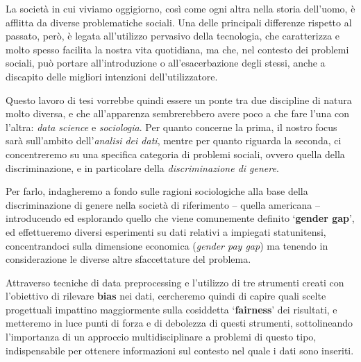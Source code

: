La societ\`a in cui viviamo oggigiorno, cos\`i come ogni altra nella storia dell'uomo, \`e afflitta da diverse problematiche sociali. Una delle principali differenze rispetto al passato, per\`o, \`e legata all'utilizzo pervasivo della tecnologia, che caratterizza e molto spesso facilita la nostra vita quotidiana, ma che, nel contesto dei problemi sociali, pu\`o portare all'introduzione o all'esacerbazione degli stessi, anche a discapito delle migliori intenzioni dell'utilizzatore.

Questo lavoro di tesi vorrebbe quindi essere un ponte tra due discipline di natura molto diversa, e che all'apparenza sembrerebbero avere poco a che fare l'una con l'altra: \textit{data science} e \textit{sociologia}. Per quanto concerne la prima, il nostro focus sar\`a sull'ambito dell'\textit{analisi dei dati}, mentre per quanto riguarda la seconda, ci concentreremo su una specifica categoria di problemi sociali, ovvero quella della discriminazione, e in particolare della \textit{discriminazione di genere}.

Per farlo, indagheremo a fondo sulle ragioni sociologiche alla base della discriminazione di genere nella societ\`a di riferimento -- quella americana -- introducendo ed esplorando quello che viene comunemente definito `\textbf{gender gap}', ed effettueremo diversi esperimenti su dati relativi a impiegati statunitensi, concentrandoci sulla dimensione economica (\textit{gender pay gap}) ma tenendo in considerazione le diverse altre sfaccettature del problema.

Attraverso tecniche di data preprocessing e l'utilizzo di tre strumenti creati con l'obiettivo di rilevare \textbf{bias} nei dati, cercheremo quindi di capire quali scelte progettuali impattino maggiormente sulla cosiddetta `\textbf{fairness}' dei risultati, e metteremo in luce punti di forza e di debolezza di questi strumenti, sottolineando l'importanza di un approccio multidisciplinare a problemi di questo tipo, indispensabile per ottenere informazioni sul contesto nel quale i dati sono inseriti.
